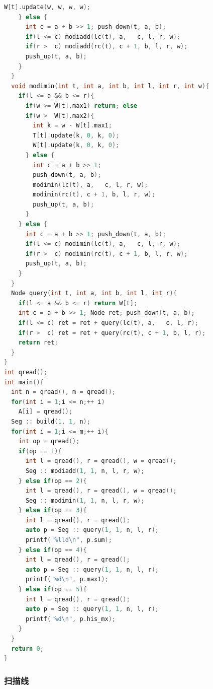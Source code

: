 \documentclass[10pt]{ctexart}
\begin{document}
\begin{multicols}{3}
\begin{lstlisting}[language={C++}]
      W[t].update(w, w, w, w);
    } else {
      int c = a + b >> 1; push_down(t, a, b);
      if(l <= c) modiadd(lc(t), a,   c, l, r, w);
      if(r >  c) modiadd(rc(t), c + 1, b, l, r, w);
      push_up(t, a, b);
    }
  }
  void modimin(int t, int a, int b, int l, int r, int w){
    if(l <= a && b <= r){
      if(w >= W[t].max1) return; else 
      if(w >  W[t].max2){
        int k = w - W[t].max1;
        T[t].update(k, 0, k, 0);
        W[t].update(k, 0, k, 0);
      } else {
        int c = a + b >> 1;
        push_down(t, a, b);
        modimin(lc(t), a,   c, l, r, w);
        modimin(rc(t), c + 1, b, l, r, w);
        push_up(t, a, b);
      }
    } else {
      int c = a + b >> 1; push_down(t, a, b);
      if(l <= c) modimin(lc(t), a,   c, l, r, w);
      if(r >  c) modimin(rc(t), c + 1, b, l, r, w);
      push_up(t, a, b);
    }
  }
  Node query(int t, int a, int b, int l, int r){
    if(l <= a && b <= r) return W[t];
    int c = a + b >> 1; Node ret; push_down(t, a, b);
    if(l <= c) ret = ret + query(lc(t), a,   c, l, r);
    if(r >  c) ret = ret + query(rc(t), c + 1, b, l, r);
    return ret;
  }
}
int qread();
int main(){  
  int n = qread(), m = qread();
  for(int i = 1;i <= n;++ i)
    A[i] = qread();
  Seg :: build(1, 1, n);
  for(int i = 1;i <= m;++ i){
    int op = qread();
    if(op == 1){
      int l = qread(), r = qread(), w = qread();
      Seg :: modiadd(1, 1, n, l, r, w);
    } else if(op == 2){
      int l = qread(), r = qread(), w = qread();
      Seg :: modimin(1, 1, n, l, r, w);
    } else if(op == 3){
      int l = qread(), r = qread();
      auto p = Seg :: query(1, 1, n, l, r);
      printf("%lld\n", p.sum);
    } else if(op == 4){
      int l = qread(), r = qread();
      auto p = Seg :: query(1, 1, n, l, r);
      printf("%d\n", p.max1);
    } else if(op == 5){
      int l = qread(), r = qread();
      auto p = Seg :: query(1, 1, n, l, r);
      printf("%d\n", p.his_mx);
    }
  }
  return 0;
}
\end{lstlisting}

    \subsubsection{扫描线}\label{ux626bux63cfux7ebf}


\end{multicols}
\end{document}
